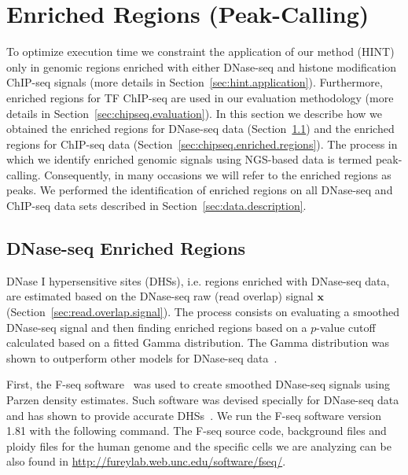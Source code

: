 \section{Enriched Regions (Peak-Calling)}
\label{sec:enriched.regions}

To optimize execution time we constraint the application of our method (HINT) only in genomic regions enriched with either DNase-seq and histone modification ChIP-seq signals (more details in Section~\ref{sec:hint.application}). Furthermore, enriched regions for TF ChIP-seq are used in our evaluation methodology (more details in Section~\ref{sec:chipseq.evaluation}). In this section we describe how we obtained the enriched regions for DNase-seq data (Section~\ref{sec:dnaseseq.enriched.regions}) and the enriched regions for ChIP-seq data (Section~\ref{sec:chipseq.enriched.regions}). The process in which we identify enriched genomic signals using NGS-based data is termed peak-calling. Consequently, in many occasions we will refer to the enriched regions as peaks. We performed the identification of enriched regions on all DNase-seq and ChIP-seq data sets described in Section~\ref{sec:data.description}.

\subsection{DNase-seq Enriched Regions}
\label{sec:dnaseseq.enriched.regions}

DNase I hypersensitive sites (DHSs), i.e. regions enriched with DNase-seq data, are estimated based on the DNase-seq raw (read overlap) signal $\mathbf{x}$ (Section~\ref{sec:read.overlap.signal}). The process consists on evaluating a smoothed DNase-seq signal and then finding enriched regions based on a $p$-value cutoff calculated based on a fitted Gamma distribution. The Gamma distribution was shown to outperform other models for DNase-seq data~\cite{boyle2008b}.

First, the F-seq software~\cite{boyle2008b} was used to create smoothed DNase-seq signals using Parzen density estimates. Such software was devised specially for DNase-seq data and has shown to provide accurate DHSs~\cite{boyle2008b,boyle2011}. We run the F-seq software version 1.81 with the following command. The F-seq source code, background files and ploidy files for the human genome and the specific cells we are analyzing can be also found in \url{http://fureylab.web.unc.edu/software/fseq/}.

